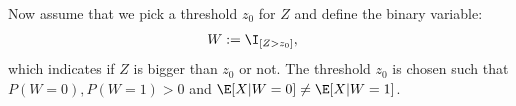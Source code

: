%

Now assume that we pick a threshold $z_0$ for $Z$ and define the binary variable:
        \begin{align*}
          W &:= \I_{[Z > z_0]},
        \end{align*}
which indicates if $Z$ is bigger than $z_0$ or not. The threshold $z_0$ is chosen such that
 $P(W=0), P(W=1) >0$ and $\E[X|W=0] \neq \E[X|W=1]$.

